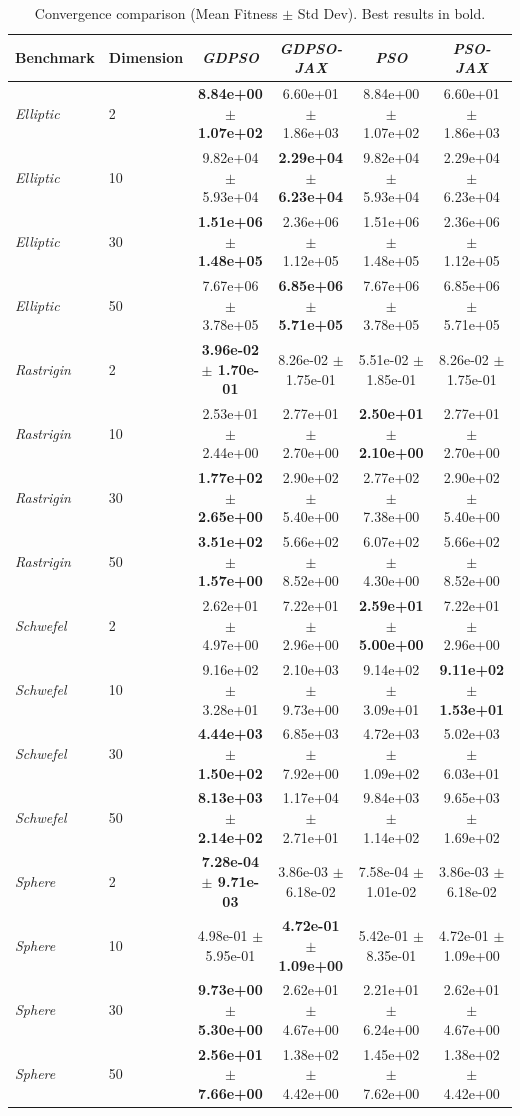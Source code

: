 \begin{table}[h]
\caption{Convergence comparison (Mean Fitness $\pm$ Std Dev). Best results in bold.}
\label{tab:convergence}
\begin{tabular}{llcccc}
\toprule
Benchmark & Dimension & \textit{GDPSO} & \textit{GDPSO-JAX} & \textit{PSO} & \textit{PSO-JAX} \\
\midrule
\textit{Elliptic} & 2 & \textbf{8.84e+00 $\pm$ 1.07e+02} & 6.60e+01 $\pm$ 1.86e+03 & 8.84e+00 $\pm$ 1.07e+02 & 6.60e+01 $\pm$ 1.86e+03 \\
\textit{Elliptic} & 10 & 9.82e+04 $\pm$ 5.93e+04 & \textbf{2.29e+04 $\pm$ 6.23e+04} & 9.82e+04 $\pm$ 5.93e+04 & 2.29e+04 $\pm$ 6.23e+04 \\
\textit{Elliptic} & 30 & \textbf{1.51e+06 $\pm$ 1.48e+05} & 2.36e+06 $\pm$ 1.12e+05 & 1.51e+06 $\pm$ 1.48e+05 & 2.36e+06 $\pm$ 1.12e+05 \\
\textit{Elliptic} & 50 & 7.67e+06 $\pm$ 3.78e+05 & \textbf{6.85e+06 $\pm$ 5.71e+05} & 7.67e+06 $\pm$ 3.78e+05 & 6.85e+06 $\pm$ 5.71e+05 \\
\textit{Rastrigin} & 2 & \textbf{3.96e-02 $\pm$ 1.70e-01} & 8.26e-02 $\pm$ 1.75e-01 & 5.51e-02 $\pm$ 1.85e-01 & 8.26e-02 $\pm$ 1.75e-01 \\
\textit{Rastrigin} & 10 & 2.53e+01 $\pm$ 2.44e+00 & 2.77e+01 $\pm$ 2.70e+00 & \textbf{2.50e+01 $\pm$ 2.10e+00} & 2.77e+01 $\pm$ 2.70e+00 \\
\textit{Rastrigin} & 30 & \textbf{1.77e+02 $\pm$ 2.65e+00} & 2.90e+02 $\pm$ 5.40e+00 & 2.77e+02 $\pm$ 7.38e+00 & 2.90e+02 $\pm$ 5.40e+00 \\
\textit{Rastrigin} & 50 & \textbf{3.51e+02 $\pm$ 1.57e+00} & 5.66e+02 $\pm$ 8.52e+00 & 6.07e+02 $\pm$ 4.30e+00 & 5.66e+02 $\pm$ 8.52e+00 \\
\textit{Schwefel} & 2 & 2.62e+01 $\pm$ 4.97e+00 & 7.22e+01 $\pm$ 2.96e+00 & \textbf{2.59e+01 $\pm$ 5.00e+00} & 7.22e+01 $\pm$ 2.96e+00 \\
\textit{Schwefel} & 10 & 9.16e+02 $\pm$ 3.28e+01 & 2.10e+03 $\pm$ 9.73e+00 & 9.14e+02 $\pm$ 3.09e+01 & \textbf{9.11e+02 $\pm$ 1.53e+01} \\
\textit{Schwefel} & 30 & \textbf{4.44e+03 $\pm$ 1.50e+02} & 6.85e+03 $\pm$ 7.92e+00 & 4.72e+03 $\pm$ 1.09e+02 & 5.02e+03 $\pm$ 6.03e+01 \\
\textit{Schwefel} & 50 & \textbf{8.13e+03 $\pm$ 2.14e+02} & 1.17e+04 $\pm$ 2.71e+01 & 9.84e+03 $\pm$ 1.14e+02 & 9.65e+03 $\pm$ 1.69e+02 \\
\textit{Sphere} & 2 & \textbf{7.28e-04 $\pm$ 9.71e-03} & 3.86e-03 $\pm$ 6.18e-02 & 7.58e-04 $\pm$ 1.01e-02 & 3.86e-03 $\pm$ 6.18e-02 \\
\textit{Sphere} & 10 & 4.98e-01 $\pm$ 5.95e-01 & \textbf{4.72e-01 $\pm$ 1.09e+00} & 5.42e-01 $\pm$ 8.35e-01 & 4.72e-01 $\pm$ 1.09e+00 \\
\textit{Sphere} & 30 & \textbf{9.73e+00 $\pm$ 5.30e+00} & 2.62e+01 $\pm$ 4.67e+00 & 2.21e+01 $\pm$ 6.24e+00 & 2.62e+01 $\pm$ 4.67e+00 \\
\textit{Sphere} & 50 & \textbf{2.56e+01 $\pm$ 7.66e+00} & 1.38e+02 $\pm$ 4.42e+00 & 1.45e+02 $\pm$ 7.62e+00 & 1.38e+02 $\pm$ 4.42e+00 \\
\bottomrule
\end{tabular}
\end{table}
